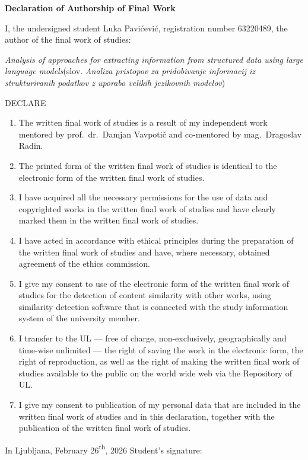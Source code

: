 \documentclass[a4paper, 12pt]{book}
\begin{document}

\vspace*{-12mm} %
\begin{center}
  {\Large\textbf{\sc Declaration of Authorship of Final Work}}
\end{center}
%
\vspace{1mm}
\noindent I, the undersigned student Luka Pavićević, registration number 63220489, the author of the final
work of studies:

\vspace{1mm}
\noindent\emph{Analysis of approaches for extracting information from structured data using large
language models}\hspace{5mm}(slov. \emph{Analiza pristopov za pridobivanje informacij iz strukturiranih
    podatkov z uporabo
velikih jezikovnih modelov})

\vspace{1mm}
\begin{center}DECLARE
\end{center}
\begin{enumerate}
    \setlength\itemsep{0mm}
  \item The written final work of studies is a result of my independent work mentored by prof.\ dr.\ Damjan
    Vavpotič and co-mentored by mag.\ Dragoslav Radin.
  \item The printed form of the written final work of studies is identical to the electronic form of the
    written final work of studies.
  \item I have acquired all the necessary permissions for the use of data and copyrighted works in the
    written final work of studies and have clearly marked them in the written final work of studies.
  \item I have acted in accordance with ethical principles during the preparation of the written final work
    of studies and have, where necessary, obtained agreement of the ethics commission.
  \item I give my consent to use of the electronic form of the written final work of studies for the
    detection of content similarity with other works, using similarity detection software that is connected
    with the study information system of the university member.
  \item I transfer to the UL --- free of charge, non-exclusively, geographically and time-wise unlimited ---
    the right of saving the work in the electronic form, the right of reproduction, as well as the right of
    making the written final work of studies available to the public on the world wide web via the Repository of UL.
  \item I give my consent to publication of my personal data that are included in the written final work of
    studies and in this declaration, together with the publication of the written final work of studies.
\end{enumerate}

\vspace{2mm}
\noindent In Ljubljana, February 26{\textsuperscript{th}}, 2026 \hfill Student's signature:


\end{document}
